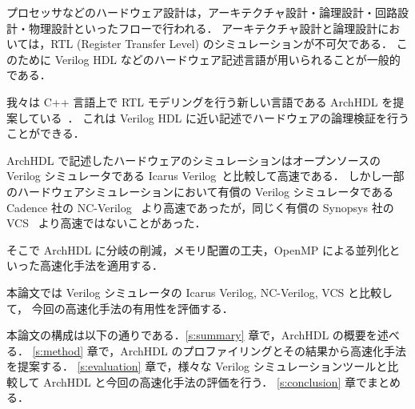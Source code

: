 プロセッサなどのハードウェア設計は，アーキテクチャ設計・論理設計・回路設計・物理設計といったフローで行われる．
アーキテクチャ設計と論理設計においては，RTL (Register Transfer Level) のシミュレーションが不可欠である．
このために Verilog HDL などのハードウェア記述言語が用いられることが一般的である．

我々は C++ 言語上で RTL モデリングを行う新しい言語である ArchHDL を提案している~\cite{satos:archhdl}．
これは Verilog HDL に近い記述でハードウェアの論理検証を行うことができる．

ArchHDL で記述したハードウェアのシミュレーションはオープンソースの Verilog シミュレータである Icarus Verilog~\cite{iverilog}と比較して高速である．
しかし一部のハードウェアシミュレーションにおいて有償の Verilog シミュレータである Cadence 社の NC-Verilog~\cite{ncverilog} より高速であったが，同じく有償の Synopsys 社の VCS~\cite{vcs} より高速ではないことがあった．

そこで ArchHDL に分岐の削減，メモリ配置の工夫，OpenMP による並列化といった高速化手法を適用する．

本論文では Verilog シミュレータの Icarus Verilog, NC-Verilog, VCS と比較して，
今回の高速化手法の有用性を評価する．

本論文の構成は以下の通りである．\ref{s:summary} 章で，ArchHDL の概要を述べる．
\ref{s:method} 章で，ArchHDL のプロファイリングとその結果から高速化手法を提案する．
\ref{s:evaluation} 章で，様々な Verilog シミュレーションツールと比較して ArchHDL と今回の高速化手法の評価を行う．
\ref{s:conclusion} 章でまとめる．